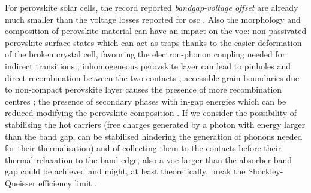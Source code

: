	For perovskite solar cells, the record reported \textit{bandgap\hyp{}voltage offset} are already much smaller than the voltage losses reported for \gls{osc} \cite{Tvingstedt2015}.
	Also the morphology and composition of perovskite material can have an impact on the \gls{voc}: non-passivated perovskite surface states which can act as traps \cite{Zheng2017} thanks to the easier deformation of the broken crystal cell, favouring the electron-phonon coupling needed for indirect transitions \cite{Wu2015}; inhomogeneous perovskite layer can lead to pinholes and direct recombination between the two contacts \cite{Lee2015,Montcada2017,Qiu2016,Marchioro2014}; accessible grain boundaries due to non-compact perovskite layer causes the presence of more recombination centres \cite{Shao2016a}; the presence of secondary phases with in-gap energies which can be reduced modifying the perovskite composition \cite{Bi2016}.
	If we consider the possibility of stabilising the hot carriers (free charges generated by a photon with energy larger than the band gap, can be stabilised hindering the generation of phonons needed for their thermalisation) and of collecting them to the contacts before their thermal relaxation to the band edge, also a \gls{voc} larger than the absorber band gap could be achieved and might, at least theoretically, break the Shockley\hyp{}Queisser efficiency limit \cite{WikipediaSQlimit}.
	


